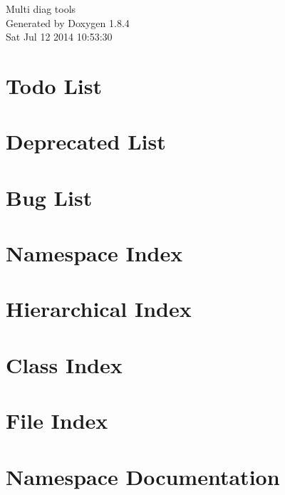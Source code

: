 \documentclass[twoside]{book}
\newcommand{\clearemptydoublepage}{%
  \newpage{\pagestyle{empty}\cleardoublepage}%
}
\begin{document}
\hypersetup{pageanchor=false}
\begin{titlepage}
\vspace*{7cm}
\begin{center}%
{\Large Multi diag tools }\\
\vspace*{1cm}
{\large Generated by Doxygen 1.8.4}\\
\vspace*{0.5cm}
{\small Sat Jul 12 2014 10:53:30}\\
\end{center}
\end{titlepage}
\clearemptydoublepage
\tableofcontents
\clearemptydoublepage
{}
\hypersetup{pageanchor=true}

\chapter{Todo List}
\label{todo}
\hypertarget{todo}{}

\chapter{Deprecated List}
\label{deprecated}
\hypertarget{deprecated}{}

\chapter{Bug List}
\label{bug}
\hypertarget{bug}{}

\chapter{Namespace Index}

\chapter{Hierarchical Index}

\chapter{Class Index}

\chapter{File Index}

\chapter{Namespace Documentation}




\end{document}
